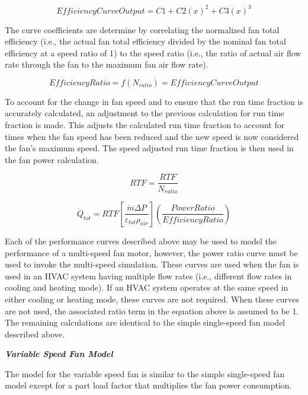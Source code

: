 \begin{equation}
EfficiencyCurveOutput = C1 + C2{\left( x \right)^2} + C3{\left( x \right)^3}
\end{equation}

The curve coefficients are determine by correlating the normalized fan total efficiency (i.e., the actual fan total efficiency divided by the nominal fan total efficiency at a speed ratio of 1) to the speed ratio (i.e., the ratio of actual air flow rate through the fan to the maximum fan air flow rate).

\begin{equation}
EfficiencyRatio = f\left( {{N_{ratio}}} \right) = EfficiencyCurveOutput
\end{equation}

To account for the change in fan speed and to ensure that the run time fraction is accurately calculated, an adjustment to the previous calculation for run time fraction is made. This adjusts the calculated run time fraction to account for times when the fan speed has been reduced and the new speed is now considered the fan's maximum speed. The speed adjusted run time fraction is then used in the fan power calculation.

\begin{equation}
RTF = \frac{RTF}{N_{ratio}}
\end{equation}

\begin{equation}
{\dot{Q}_{tot}} = RTF\left[ {\frac{{\dot{m} \Delta P}}{{{\varepsilon_{tot}}{\rho_{air}}}}} \right]\left( {\frac{{PowerRatio}}{{EfficiencyRatio}}} \right)
\end{equation}

Each of the performance curves described above may be used to model the performance of a multi-speed fan motor, however, the power ratio curve must be used to invoke the multi-speed simulation. These curves are used when the fan is used in an HVAC system having multiple flow rates (i.e., different flow rates in cooling and heating mode). If an HVAC system operates at the same speed in either cooling or heating mode, these curves are not required. When these curves are not used, the associated ratio term in the equation above is assumed to be 1. The remaining calculations are identical to the simple single-speed fan model described above.

\emph{\textbf{Variable Speed Fan Model}}

The model for the variable speed fan is similar to the simple single-speed fan model except for a part load factor that multiplies the fan power consumption.

